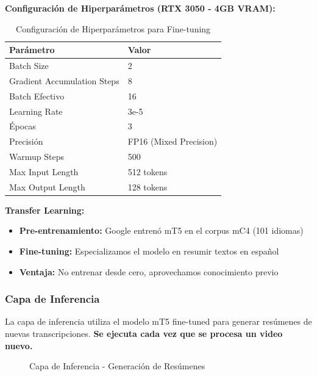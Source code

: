 \documentclass[12pt,a4paper]{article}
\begin{document}
\textbf{Configuración de Hiperparámetros (RTX 3050 - 4GB VRAM):}
\begin{table}[H]
\centering
\begin{tabular}{ll}
\toprule
\textbf{Parámetro} & \textbf{Valor} \\
\midrule
Batch Size & 2 \\
Gradient Accumulation Steps & 8 \\
Batch Efectivo & 16 \\
Learning Rate & 3e-5 \\
Épocas & 3 \\
Precisión & FP16 (Mixed Precision) \\
Warmup Steps & 500 \\
Max Input Length & 512 tokens \\
Max Output Length & 128 tokens \\
\bottomrule
\end{tabular}
\caption{Configuración de Hiperparámetros para Fine-tuning}
\label{tab:hiperparametros}
\end{table}

\textbf{Transfer Learning:}
\begin{itemize}
    \item \textbf{Pre-entrenamiento:} Google entrenó mT5 en el corpus mC4 (101 idiomas)
    \item \textbf{Fine-tuning:} Especializamos el modelo en resumir textos en español
    \item \textbf{Ventaja:} No entrenar desde cero, aprovechamos conocimiento previo
\end{itemize}

\newpage

\subsubsection{Capa de Inferencia}

La capa de inferencia utiliza el modelo mT5 fine-tuned para generar resúmenes de nuevas transcripciones. \textbf{Se ejecuta cada vez que se procesa un video nuevo.}

\begin{figure}[H]
    \centering
    \caption{Capa de Inferencia - Generación de Resúmenes}
    \label{fig:capa_inferencia}
\end{figure}
\end{document}
